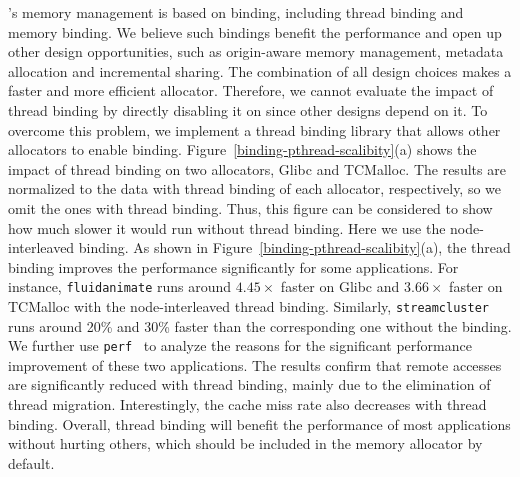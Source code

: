 
\NM{}'s memory management is based on binding, including thread binding and memory binding. We believe such bindings benefit the performance and open up other design opportunities, such as origin-aware memory management, metadata allocation and incremental sharing. The combination of all design choices makes \NM{} a faster and more efficient allocator. Therefore, we cannot evaluate the impact of thread binding by directly disabling it on \NM{} since other designs depend on it. To overcome this problem, we implement a thread binding library that allows other allocators to enable binding.
Figure~\ref{binding-pthread-scalibity}(a) shows the impact of thread binding on two allocators, Glibc and TCMalloc.
The results are normalized to the data with thread binding of each allocator, respectively, so we omit the ones with thread binding. Thus, this figure can be considered to show how much slower it would run without thread binding.
Here we use the node-interleaved binding. As shown in Figure~\ref{binding-pthread-scalibity}(a), the thread binding improves the performance significantly for some applications. For instance, \texttt{fluidanimate} runs around $4.45\times$ faster on Glibc and $3.66\times$ faster on TCMalloc with the node-interleaved thread binding. Similarly, \texttt{streamcluster} runs around 20\% and 30\% faster than the corresponding one without the binding. 
We further use \texttt{perf}~\cite{perfweb} to analyze the reasons for the significant performance improvement of these two applications. The results confirm that remote accesses are significantly reduced with thread binding, mainly due to the elimination of thread migration. Interestingly, the cache miss rate also decreases with thread binding. Overall, thread binding will benefit the performance of most applications without hurting others,
which should be included in the memory allocator by default. 


